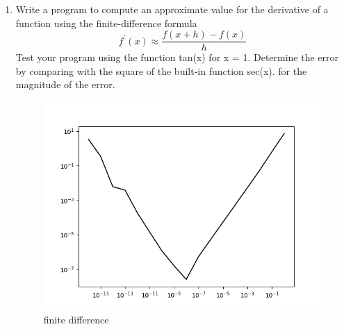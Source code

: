 \documentclass{article}
\begin{document}
\begin{enumerate}
\begin{enumerate}
\end{enumerate}
 
\pagebreak
\item Write a program to compute an approximate value for the derivative of a function
using the finite-difference formula
$$ f^{\prime}(x) \approx \frac{f(x+h)-f(x)}{h}$$
Test your program using the function tan(x) for x = 1. Determine the error by
comparing with the square of the built-in function sec(x). 
for the magnitude of the error.
    \begin{figure}[hbt!]
        \centering
        \includegraphics[width=1\linewidth]{finite_diff.png}
        \caption{ finite difference}
        \label{fig: finite diffrence}
    \end{figure}
    


\end{enumerate}
\end{document}
